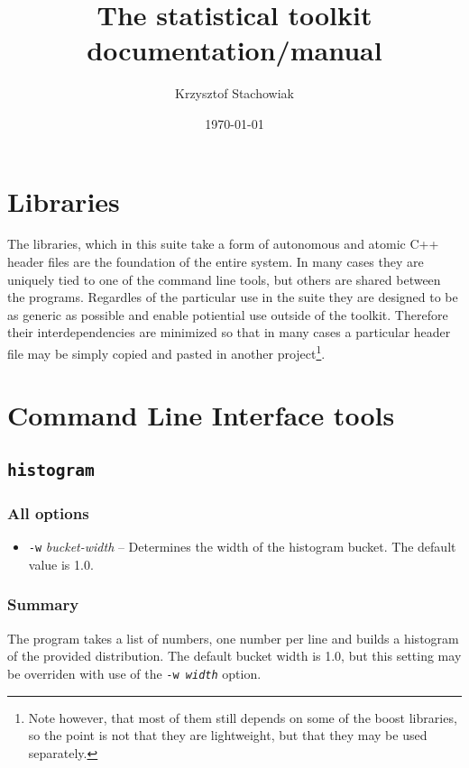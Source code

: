 \documentclass{report}
\begin{document}
\title{The statistical toolkit documentation/manual}
\author{Krzysztof Stachowiak}
\date{\today}

\maketitle

\tableofcontents

\chapter{Libraries}
The libraries, which in this suite take a form of autonomous and atomic C++
header files are the foundation of the entire system. In many cases they are
uniquely tied to one of the command line tools, but others are shared between
the programs. Regardles of the particular use in the suite they are designed to
be as generic as possible and enable potiential use outside of the toolkit.
Therefore their interdependencies are minimized so that in many cases a
particular header file may be simply copied and pasted in another
project\footnote{Note however, that most of them still depends on some of the boost
libraries, so the point is not that they are lightweight, but that they may be
used separately.}.

\chapter{Command Line Interface tools}

\section{\texttt{histogram}}

\subsection{All options}
\begin{itemize}
	\item \texttt{-w} \textit{bucket-width} -- Determines the width of the
		histogram bucket. The default value is 1.0.
\end{itemize}

\subsection{Summary}
The program takes a list of numbers, one number per line and builds
a histogram of the provided distribution. The default bucket width is 1.0,
but this setting may be overriden with use of the \texttt{-w \textit{width}}
option.
\end{document}
